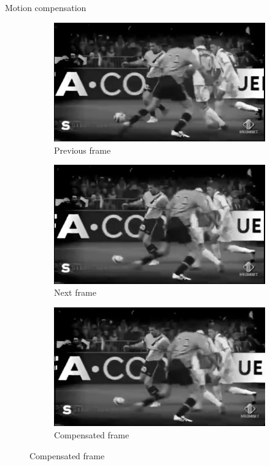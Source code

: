 \documentclass[aspectratio=1610,xcolor=dvipsnames]{beamer}
\begin{document}
\begin{frame}{Motion compensation}
    \begin{figure}[htbp]
        \begin{subfigure}[b]{0.3\textwidth}
            \centering
            \includegraphics[width=\textwidth]{images/dp-previous.png}
            \caption{Previous frame}
            \label{fig:dp-prev-frame}
        \end{subfigure}
        \hfill
        \begin{subfigure}[b]{0.3\textwidth}
            \includegraphics[width=\textwidth]{images/dp-current.png}
            \caption{Next frame}
            \label{fig:dp-curr-frame}
        \end{subfigure}
        \hfill
        \begin{subfigure}[b]{0.3\textwidth}
            \includegraphics[width=\textwidth]{images/dp-compensated.png}
            \caption{Compensated frame}
            \label{fig:dp-compensated}
        \end{subfigure}
        

\end{figure}
\end{frame}
\end{document}
